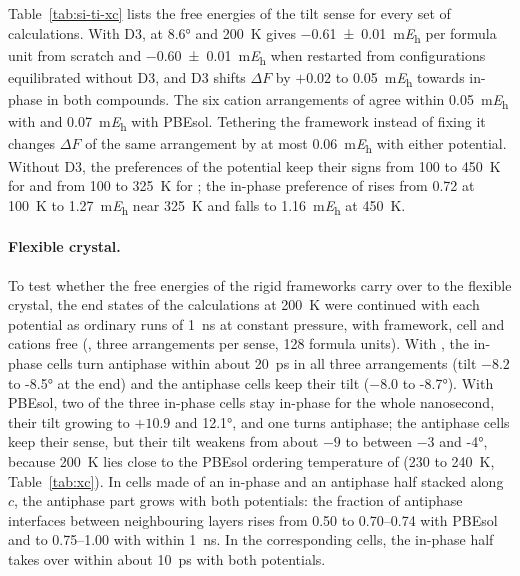 \section{\protect{}}
\label{si:ti-xc}
{\changedcolor
Table~\ref{tab:si-ti-xc} lists the free energies of the tilt sense for every set of calculations. With D3, \MASnI{} at
\ang{8.6} and \SI{200}{K} gives \SI{-0.61 \pm 0.01}{\milli\hartree} per formula unit from scratch and
\SI{-0.60 \pm 0.01}{\milli\hartree} when restarted from configurations equilibrated without D3, and D3 shifts $\Delta F$
by $+0.02$ to \SI{+0.05}{\milli\hartree} towards in-phase in both compounds. The six cation arrangements of \MASnI{}
agree within \SI{0.05}{\milli\hartree} with \rSCAN{} and \SI{0.07}{\milli\hartree} with PBEsol. Tethering the framework
instead of fixing it changes $\Delta F$ of the same arrangement by at most \SI{0.06}{\milli\hartree} with either
potential. Without D3, the preferences of the \rSCAN{} potential keep their signs from 100 to \SI{450}{K} for \FASnI{}
and from 100 to \SI{325}{K} for \MASnI{}; the in-phase preference of \FASnI{} rises from 0.72 at \SI{100}{K} to
\SI{1.27}{\milli\hartree} near \SI{325}{K} and falls to \SI{1.16}{\milli\hartree} at \SI{450}{K}.

\paragraph{Flexible crystal.} To test whether the free energies of the rigid frameworks carry over to the flexible
crystal, the end states of the calculations at \SI{200}{K} were continued with each potential as ordinary runs of
\SI{1}{ns} at constant pressure, with framework, cell and cations free (\MASnI{}, three arrangements per sense, 128
formula units). With \rSCAN{}, the in-phase cells turn antiphase within about \SI{20}{ps} in all three arrangements (tilt
$-8.2$ to \ang{-8.5} at the end) and the antiphase cells keep their tilt ($-8.0$ to \ang{-8.7}). With PBEsol, two of the
three in-phase cells stay in-phase for the whole nanosecond, their tilt growing to $+10.9$ and \ang{+12.1}, and one turns
antiphase; the antiphase cells keep their sense, but their tilt weakens from about $-9$ to between $-3$ and \ang{-4},
because \SI{200}{K} lies close to the PBEsol ordering temperature of \MASnI{} (230 to \SI{240}{K},
Table~\ref{tab:xc}). In cells made of an in-phase and an antiphase half stacked along $c$, the antiphase part grows with
both potentials: the fraction of antiphase interfaces between neighbouring layers rises from 0.50 to 0.70--0.74 with
PBEsol and to 0.75--1.00 with \rSCAN{} within \SI{1}{ns}. In the corresponding \FASnI{} cells, the in-phase half takes
over within about \SI{10}{ps} with both potentials.

}
